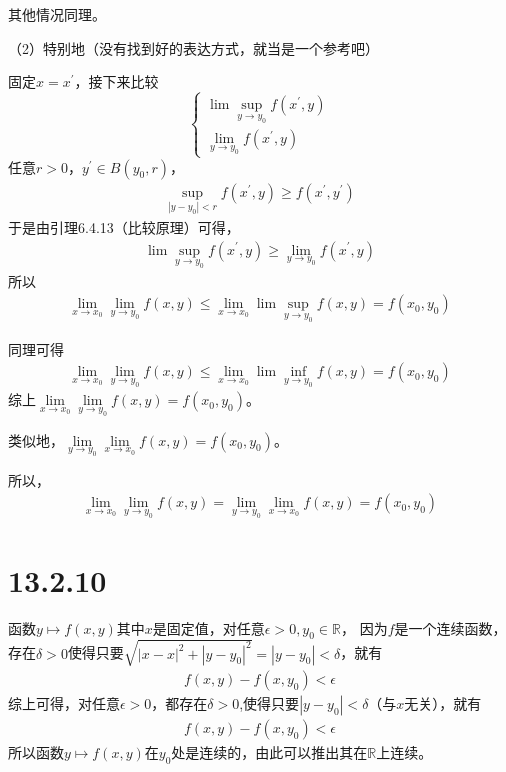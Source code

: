 \documentclass{article}
\begin{document}
其他情况同理。

（2）特别地（没有找到好的表达方式，就当是一个参考吧）

固定$x = x^\prime$，接下来比较
\begin{equation*}
  \begin{cases*}
    \lim \sup \limits_{y \to y_0} f(x^\prime, y) \\
    \lim\limits_{y \to y_0} f(x^\prime, y)
  \end{cases*}
\end{equation*}
任意$r > 0$，$y^\prime \in B(y_0, r)$，
\begin{align*}
  \sup \limits_{|y - y_0|<r} f(x^\prime, y) \geq f(x^\prime, y^\prime)
\end{align*}
于是由引理6.4.13（比较原理）可得，
\begin{align*}
  \lim \sup \limits_{y \to y_0} f(x^\prime, y) \geq \lim\limits_{y \to y_0} f(x^\prime, y)
\end{align*}
所以
\begin{align*}
 \lim\limits_{x \to x_0} \lim\limits_{y \to y_0} f(x, y) \leq \lim \limits_{x \to x_0}\lim \sup \limits_{y \to y_0}f(x, y) = f(x_0, y_0)
\end{align*}

同理可得
\begin{align*}
 \lim\limits_{x \to x_0} \lim\limits_{y \to y_0} f(x, y) \leq \lim \limits_{x \to x_0}\lim \inf \limits_{y \to y_0}f(x, y) = f(x_0, y_0)
\end{align*}
综上$\lim\limits_{x \to x_0} \lim\limits_{y \to y_0} f(x, y) = f(x_0, y_0)$。

类似地，$\lim\limits_{y \to y_0} \lim\limits_{x \to x_0} f(x, y) = f(x_0, y_0)$。

所以，
\begin{align*}
  \lim\limits_{x \to x_0} \lim\limits_{y \to y_0} f(x, y) = \lim\limits_{y \to y_0} \lim\limits_{x \to x_0} f(x, y) = f(x_0, y_0)
\end{align*}

\section*{13.2.10}

函数$y \mapsto f(x, y)$其中$x$是固定值，对任意$\epsilon > 0, y_0 \in \mathbb{R}$，
因为$f$是一个连续函数，
存在$\delta > 0$使得只要$\sqrt{|x - x|^2 + |y - y_0|^2} = |y - y_0| < \delta$，就有
\begin{align*}
  f(x, y) - f(x, y_0) < \epsilon
\end{align*}
综上可得，对任意$\epsilon > 0$，都存在$\delta > 0$,使得只要$|y - y_0| < \delta$（与$x$无关），就有
\begin{align*}
  f(x, y) - f(x, y_0) < \epsilon
\end{align*}
所以函数$y \mapsto f(x, y)$在$y_0$处是连续的，由此可以推出其在$\mathbb{R}$上连续。
\end{document}
